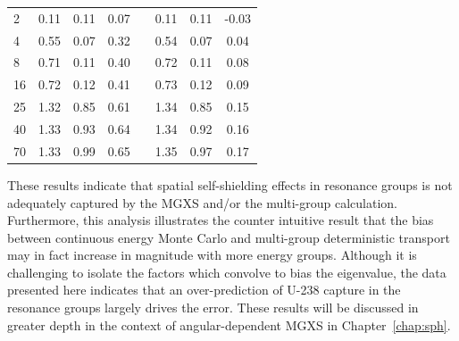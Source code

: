 {\begin{table}[H]
\begin{tabular}{a S[table-format=6.1] S[table-format=6.1] S[table-format=6.1] c S[table-format=6.1] S[table-format=6.1] S[table-format=6.1]}
2 & 0.11 & 0.11 & 0.07 & & 0.11 & 0.11 & -0.03 \\
4 & 0.55 & 0.07 & 0.32 & & 0.54 & 0.07 & 0.04 \\
8 & 0.71 & 0.11 & 0.40 & & 0.72 & 0.11 & 0.08 \\
16 & 0.72 & 0.12 & 0.41 & & 0.73 & 0.12 & 0.09 \\
25 & 1.32 & 0.85 & 0.61 & & 1.34 & 0.85 & 0.15 \\
40 & 1.33 & 0.93 & 0.64 & & 1.34 & 0.92 & 0.16 \\
70 & {} 1.33 & 0.99 & 0.65 & & 1.35 & 0.97 & 0.17 \\
  \bottomrule
\end{tabular}
\end{table}}

These results indicate that spatial self-shielding effects in resonance groups is not adequately captured by the \ac{MGXS} and/or the multi-group calculation. Furthermore, this analysis illustrates the counter intuitive result that the bias between continuous energy Monte Carlo and multi-group deterministic transport may in fact increase in magnitude with more energy groups. Although it is challenging to isolate the factors which convolve to bias the eigenvalue, the data presented here indicates that an over-prediction of U-238 capture in the resonance groups largely drives the error. These results will be discussed in greater depth in the context of angular-dependent \ac{MGXS} in Chapter~\ref{chap:sph}.